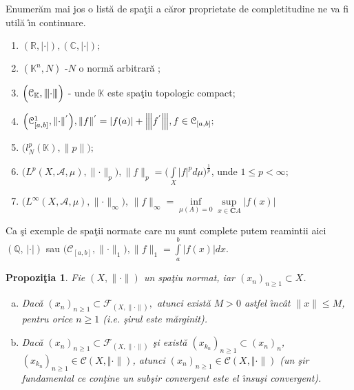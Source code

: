 \documentclass[ a4paper, 12pt]{report}
\newtheorem{prop}[theorem]{\bf Propozi\c tia }
\theoremstyle{definition}
\theoremstyle{remark}
\numberwithin{equation}{section}
\begin{document}
Enumer\u am mai jos o list\u a de spa\c tii a c\u aror proprietate de completitudine ne va fi util\u a \^\i n continuare.
\begin{enumerate}
\item $(\mathbb{R}, \lvert \cdot \rvert), (\mathbb{C}, \lvert \cdot \rvert);$
\item $(\mathbb{K}^{n}, N)$ -$N$ o norm\u a arbitrar\u a ;
\item $\Big(\mathcal{C}_{\mathbb{K}}, {\left\vert\kern-0.25ex\left\vert\kern-0.25ex\left\vert \cdot \right\vert\kern-0.25ex\right\vert\kern-0.25ex\right\vert}\Big)$ - unde $\mathbb{K}$ este spa\c tiu topologic compact;
\item $\Big(\mathcal{C}_{[a,b]}^{1}, \lVert \cdot \rVert^{'}\Big), \lVert f \rVert^{'} = \lvert f(a) \rvert + {\left\vert\kern-0.25ex\left\vert\kern-0.25ex\left\vert f^{'} \right\vert\kern-0.25ex\right\vert\kern-0.25ex\right\vert}, f \in \mathcal{C}_{[a,b]};$
\item $\Big(l_{N}^{p}(\mathbb{K}), \lVert p \rVert\Big);$
\item $\Big( L^{p}(X,\mathcal{A}, \mu), \lVert \cdot \rVert_{p}  \Big), \lVert f \rVert_{p} = \Big( \int\limits_{X} \lvert f \rvert^{p} d\mu \Big )^{\frac{1}{p}}$, unde $1 \leq p < \infty;$
\item $\Big(  L^{\infty}(X,\mathcal{A},\mu), \lVert \cdot \rVert_{\infty}\Big), \, \lVert f \rVert_{\infty} = \inf\limits_{\mu(A) = 0} \sup\limits_{x \in \mathbf{C}A}|f(x)|$
\end{enumerate}
Ca \c si exemple de spa\c tii normate care nu sunt complete putem reamintii aici $(\mathbb{Q}, \, |\cdot|)$ sau
$\Big(\mathcal{C}_{[a,b]}, \lVert \cdot \rVert_{1} \Big), \lVert f \rVert_{1} = \int\limits_{a}^{b}\lvert f(x) \rvert dx$.

\begin{prop}\label{apa}
Fie $(X, \lVert \cdot \rVert)$ un spa\c tiu normat, iar $(x_n)_{n \geq 1} \subset X$.
\begin{enumerate}[(a)]
\item Dac\u a $(x_n)_{n \geq 1} \subset \mathcal{F}_{(X, \lVert \cdot \rVert)},$ atunci  exist\u a $M>0$ astfel \^\i nc\^ at $\lVert x \rVert \leq M$, pentru orice $n \geq 1$ (i.e. \c sirul este m\u arginit).
\item Dac\u a  $(x_n)_{n \geq 1} \subset \mathcal{F}_{(X, \lVert \cdot \rVert)}$ \c si  exist\u a $(x_{k_n})_{n \geq 1} \subset (x_n)_n$, $(x_{k_n})_{n \geq 1} \in \mathcal{C}{(X, \Vert \cdot \rVert)}$, atunci $(x_n)_{n \geq 1} \in \mathcal{C}{(X, \Vert \cdot \rVert)}$ (un \c sir fundamental ce con\c tine un sub\c sir convergent este el \^\i nsu\c si convergent).
\end{enumerate}
\end{prop}
\end{document}
